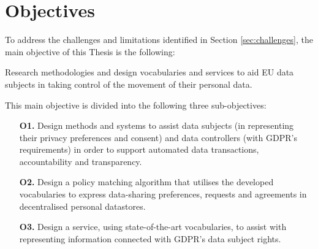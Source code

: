 \section{Objectives}
\label{sec:objectives}

To address the challenges and limitations identified in Section \ref{sec:challenges}, the main objective of this Thesis is the following:

\begin{tcolorbox}[colback=royallavender!20]
Research methodologies and design vocabularies and services to aid EU data subjects in taking control of the movement of their personal data.
\end{tcolorbox}

This main objective is divided into the following three sub-objectives:

\begin{enumerate}
    \item [\textbf{O1.}] Design methods and systems to assist data subjects (in representing their privacy preferences and consent) and data controllers (with GDPR’s requirements) in order to support automated data transactions, accountability and transparency.
    \item [\textbf{O2.}] Design a policy matching algorithm that utilises the developed vocabularies to express data-sharing preferences, requests and agreements in decentralised personal datastores.
    \item [\textbf{O3.}] Design a service, using state-of-the-art vocabularies, to assist with representing information connected with GDPR’s data subject rights.
\end{enumerate}